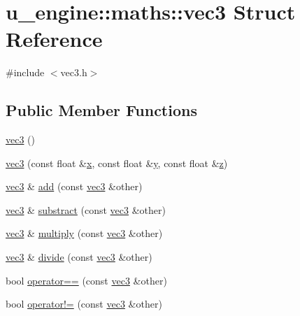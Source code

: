\hypertarget{structu__engine_1_1maths_1_1vec3}{}\section{u\+\_\+engine\+:\+:maths\+:\+:vec3 Struct Reference}
\label{structu__engine_1_1maths_1_1vec3}


{\ttfamily \#include $<$vec3.\+h$>$}

\subsection*{Public Member Functions}
\begin{DoxyCompactItemize}
\item 
\hyperlink{structu__engine_1_1maths_1_1vec3_ae639346a1535c2d8a619f5084f78ca97}{vec3} ()
\item 
\hyperlink{structu__engine_1_1maths_1_1vec3_ac8763e2f08d7ac3ee731a28d8ef29458}{vec3} (const float \&\hyperlink{glew_8h_ad77deca22f617d3f0e0eb786445689fc}{x}, const float \&\hyperlink{glew_8h_a9298c7ad619074f5285b32c6b72bfdea}{y}, const float \&\hyperlink{glew_8h_a826e1ac898f4ef56cea62219f74607db}{z})
\item 
\hyperlink{structu__engine_1_1maths_1_1vec3}{vec3} \& \hyperlink{structu__engine_1_1maths_1_1vec3_a3f96326f5d0bc679c85078f892755841}{add} (const \hyperlink{structu__engine_1_1maths_1_1vec3}{vec3} \&other)
\item 
\hyperlink{structu__engine_1_1maths_1_1vec3}{vec3} \& \hyperlink{structu__engine_1_1maths_1_1vec3_aa2da6da52c959d9196f827732efaa9fb}{substract} (const \hyperlink{structu__engine_1_1maths_1_1vec3}{vec3} \&other)
\item 
\hyperlink{structu__engine_1_1maths_1_1vec3}{vec3} \& \hyperlink{structu__engine_1_1maths_1_1vec3_ae35579d6f1e5d5f8d13f813f918da5f2}{multiply} (const \hyperlink{structu__engine_1_1maths_1_1vec3}{vec3} \&other)
\item 
\hyperlink{structu__engine_1_1maths_1_1vec3}{vec3} \& \hyperlink{structu__engine_1_1maths_1_1vec3_afa8ea0391b5de06e21b94a6b248ef093}{divide} (const \hyperlink{structu__engine_1_1maths_1_1vec3}{vec3} \&other)
\item 
bool \hyperlink{structu__engine_1_1maths_1_1vec3_a514cbc1a0f23784dcbf2a785656070aa}{operator==} (const \hyperlink{structu__engine_1_1maths_1_1vec3}{vec3} \&other)
\item 
bool \hyperlink{structu__engine_1_1maths_1_1vec3_a0c8132cf5b2b3a050b97302b695ac883}{operator!=} (const \hyperlink{structu__engine_1_1maths_1_1vec3}{vec3} \&other)

\end{DoxyCompactItemize}

